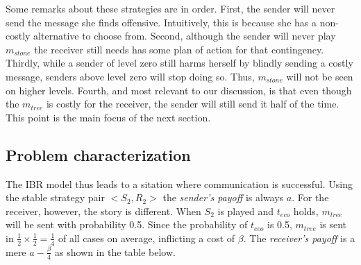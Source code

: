 \documentclass[10pt]{article}
\begin{document}
Some remarks about these strategies are in order. First, the sender will never send the message she finds offensive. Intuitively, this is because she has a non-costly alternative to choose from. Second, although the sender will never play $m_{stone}$ the receiver still needs has some plan of action for that contingency. Thirdly, while a sender of level zero still harms herself by blindly sending a costly message, senders above level zero will stop doing so. Thus, $m_{stone}$ will not be seen on higher levels. Fourth, and most relevant to our discussion, is that even though the $m_{tree}$ is costly for the receiver, the sender will still send it half of the time. This point is the main focus of the next section.

\subsection{Problem characterization}
The IBR model thus leads to a sitation where communication is successful. Using the stable strategy pair $<S_2,R_2>$ the \textit{sender's payoff} is always $a$. For the receiver, however, the story is different. When $S_2$ is played and $t_{eco}$ holds, $m_{tree}$ will be sent with probability 0.5. Since the probability of $t_{eco}$ is 0.5, $m_{tree}$ is sent in $\tfrac{1}{2}\times \tfrac{1}{2} = \tfrac{1}{4}$ of all cases on average, inflicting a cost of $\beta$. The \textit{receiver's payoff} is a mere $a-\tfrac{\beta}{4}$ as shown in the table below.
\end{document}
